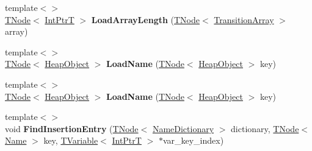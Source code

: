 \begin{DoxyCompactItemize}
{\footnotesize template$<$$>$ }\\\mbox{\hyperlink{classv8_1_1internal_1_1compiler_1_1TNode}{T\+Node}}$<$ \mbox{\hyperlink{structv8_1_1internal_1_1IntPtrT}{Int\+PtrT}} $>$ {\bfseries Load\+Array\+Length} (\mbox{\hyperlink{classv8_1_1internal_1_1compiler_1_1TNode}{T\+Node}}$<$ \mbox{\hyperlink{classv8_1_1internal_1_1TransitionArray}{Transition\+Array}} $>$ array)
\item 
\mbox{\label{classv8_1_1internal_1_1CodeStubAssembler_a4b434d7c6a69ad704e6f7e72bfc2b391}} 
{\footnotesize template$<$$>$ }\\\mbox{\hyperlink{classv8_1_1internal_1_1compiler_1_1TNode}{T\+Node}}$<$ \mbox{\hyperlink{classv8_1_1internal_1_1HeapObject}{Heap\+Object}} $>$ {\bfseries Load\+Name} (\mbox{\hyperlink{classv8_1_1internal_1_1compiler_1_1TNode}{T\+Node}}$<$ \mbox{\hyperlink{classv8_1_1internal_1_1HeapObject}{Heap\+Object}} $>$ key)
\item 
\mbox{\label{classv8_1_1internal_1_1CodeStubAssembler_a4b434d7c6a69ad704e6f7e72bfc2b391}} 
{\footnotesize template$<$$>$ }\\\mbox{\hyperlink{classv8_1_1internal_1_1compiler_1_1TNode}{T\+Node}}$<$ \mbox{\hyperlink{classv8_1_1internal_1_1HeapObject}{Heap\+Object}} $>$ {\bfseries Load\+Name} (\mbox{\hyperlink{classv8_1_1internal_1_1compiler_1_1TNode}{T\+Node}}$<$ \mbox{\hyperlink{classv8_1_1internal_1_1HeapObject}{Heap\+Object}} $>$ key)
\item 
\mbox{\label{classv8_1_1internal_1_1CodeStubAssembler_ad16518b3b778610650847f9cb772df99}} 
{\footnotesize template$<$$>$ }\\void {\bfseries Find\+Insertion\+Entry} (\mbox{\hyperlink{classv8_1_1internal_1_1compiler_1_1TNode}{T\+Node}}$<$ \mbox{\hyperlink{classv8_1_1internal_1_1NameDictionary}{Name\+Dictionary}} $>$ dictionary, \mbox{\hyperlink{classv8_1_1internal_1_1compiler_1_1TNode}{T\+Node}}$<$ \mbox{\hyperlink{classv8_1_1internal_1_1Name}{Name}} $>$ key, \mbox{\hyperlink{classv8_1_1internal_1_1compiler_1_1TypedCodeAssemblerVariable}{T\+Variable}}$<$ \mbox{\hyperlink{structv8_1_1internal_1_1IntPtrT}{Int\+PtrT}} $>$ $\ast$var\+\_\+key\+\_\+index)
\item 
\mbox{\label{classv8_1_1internal_1_1CodeStubAssembler_a3460bc7099a361690007b0bf8a2877d1}} 

\end{DoxyCompactItemize}
